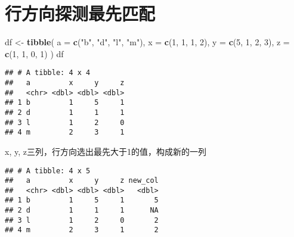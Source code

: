 \documentclass[
]{krantz}
\makeatletter
\newenvironment{Shaded}{\begin{snugshade}}{\end{snugshade}}
\newcommand{\DataTypeTok}[1]{\textcolor[rgb]{0.27,0.27,0.27}{#1}}
\newcommand{\DecValTok}[1]{\textcolor[rgb]{0.06,0.06,0.06}{#1}}
\newcommand{\KeywordTok}[1]{\textcolor[rgb]{0.27,0.27,0.27}{\textbf{#1}}}
\newcommand{\NormalTok}[1]{#1}
\newcommand{\OperatorTok}[1]{\textcolor[rgb]{0.43,0.43,0.43}{\textbf{#1}}}
\newcommand{\StringTok}[1]{\textcolor[rgb]{0.5,0.5,0.5}{#1}}
\newenvironment{kframe}{%
\medskip{}
\setlength{\fboxsep}{.8em}
 \def\at@end@of@kframe{}%
 \ifinner\ifhmode%
  \def\at@end@of@kframe{\end{minipage}}%
  \begin{minipage}{\columnwidth}%
 \fi\fi%
 \def\FrameCommand##1{\hskip\@totalleftmargin \hskip-\fboxsep
 \colorbox{shadecolor}{##1}\hskip-\fboxsep
     \hskip-\linewidth \hskip-\@totalleftmargin \hskip\columnwidth}%
 \MakeFramed {\advance\hsize-\width
   \@totalleftmargin\z@ \linewidth\hsize
   \@setminipage}}%
 {\par\unskip\endMakeFramed%
 \at@end@of@kframe}
\renewenvironment{Shaded}{\begin{kframe}}{\end{kframe}}
\makeatother
\begin{document}
\hypertarget{ux884cux65b9ux5411ux63a2ux6d4bux6700ux5148ux5339ux914d}{%
\section{行方向探测最先匹配}\label{ux884cux65b9ux5411ux63a2ux6d4bux6700ux5148ux5339ux914d}}

\begin{Shaded}
\begin{Highlighting}[]
\NormalTok{df <-}\StringTok{ }\KeywordTok{tibble}\NormalTok{(}
  \DataTypeTok{a =} \KeywordTok{c}\NormalTok{(}\StringTok{"b"}\NormalTok{, }\StringTok{"d"}\NormalTok{, }\StringTok{"l"}\NormalTok{, }\StringTok{"m"}\NormalTok{), }
  \DataTypeTok{x =} \KeywordTok{c}\NormalTok{(}\DecValTok{1}\NormalTok{, }\DecValTok{1}\NormalTok{, }\DecValTok{1}\NormalTok{, }\DecValTok{2}\NormalTok{), }
  \DataTypeTok{y =} \KeywordTok{c}\NormalTok{(}\DecValTok{5}\NormalTok{, }\DecValTok{1}\NormalTok{, }\DecValTok{2}\NormalTok{, }\DecValTok{3}\NormalTok{), }
  \DataTypeTok{z =} \KeywordTok{c}\NormalTok{(}\DecValTok{1}\NormalTok{, }\DecValTok{1}\NormalTok{, }\DecValTok{0}\NormalTok{, }\DecValTok{1}\NormalTok{)}
\NormalTok{)}
\NormalTok{df}
\end{Highlighting}
\end{Shaded}

\begin{verbatim}
## # A tibble: 4 x 4
##   a         x     y     z
##   <chr> <dbl> <dbl> <dbl>
## 1 b         1     5     1
## 2 d         1     1     1
## 3 l         1     2     0
## 4 m         2     3     1
\end{verbatim}

x, y, z三列，行方向选出最先大于1的值，构成新的一列

\begin{Shaded}
\end{Shaded}

\begin{verbatim}
## # A tibble: 4 x 5
##   a         x     y     z new_col
##   <chr> <dbl> <dbl> <dbl>   <dbl>
## 1 b         1     5     1       5
## 2 d         1     1     1      NA
## 3 l         1     2     0       2
## 4 m         2     3     1       2
\end{verbatim}
\end{document}
